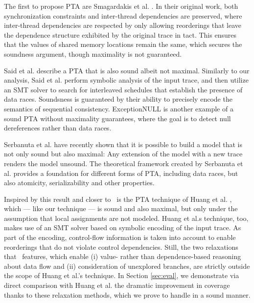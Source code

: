 The first to propose PTA are Smagardakis et al. \cite{Smaragdakis:2012}. In their original work, both synchronization constraints and inter-thread dependencies are preserved, where inter-thread dependencies are respected by 
only allowing reorderings that leave the dependence structure exhibited by the original trace in tact. This ensures that the values of shared memory locations remain the same, which secures the soundness argument, though maximality is not guaranteed.

Said et al. \cite{Said:2011} describe a PTA that is also sound albeit not maximal. Similarly to our analysis, Said et al. perform symbolic analysis of the input trace, and then utilize an SMT solver to search for interleaved schedules that establish the presence of data races. Soundsness is guaranteed by their ability to precisely encode the semantics of sequential consistency. ExceptionNULL \cite{Farzan:2012} is another example of a sound PTA without maximality guarantees, where the goal is to detect null dereferences rather than data races. 

Serbanuta et al. \cite{SerbanutaCR12} have recently shown that it is possible to build a model that is not only sound but also maximal: Any extension of the model with a new trace renders the model unsound. The theoretical framework created by Serbanuta et al. provides a foundation for different forms of PTA, including data races, but also atomicity, serializability and other properties. 

Inspired by this result and closer to \tool\ is the PTA technique of Huang et al. \cite{HuangMR14}, which --- like our technique --- is sound and also maximal, but only under the assumption that local assignments are not modeled. Huang et al.s technique, too, makes use of an SMT solver based on symbolic encoding of the input trace. As part of the encoding, control-flow information is taken into account to enable reorderings that do not violate control dependencies. Still, the two relaxations that \tool\ features, which enable (i) value- rather than dependence-based reasoning about data flow and (ii) consideration of unexplored branches, are strictly outside the scope of Huang et al.'s technique. In Section \ref{sec:eval}, we demonstrate via direct comparison with Huang et al. the dramatic improvement in coverage thanks to these relaxation methods, which we prove to handle in a sound manner.


